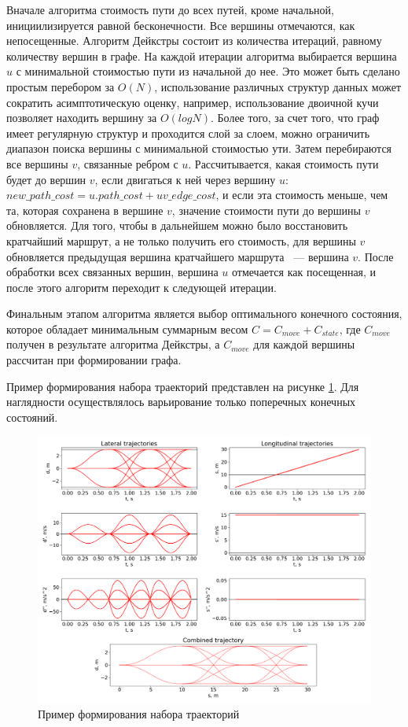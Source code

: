 Вначале алгоритма стоимость пути до всех путей, кроме начальной, инициилизируется равной бесконечности. Все вершины
отмечаются, как непосещенные.
Алгоритм Дейкстры состоит из количества итераций, равному количеству вершин в графе. На каждой итерации алгоритма
выбирается вершина $u$ с минимальной стоимостью пути из начальной до нее. Это может быть сделано
простым перебором за $O(N)$, использование различных структур данных может сократить асимптотическую оценку, например,
использование двоичной кучи позволяет находить вершину за $O(logN)$. Более того, за счет того, что граф
имеет регулярную структур и проходится слой за слоем, можно ограничить диапазон поиска вершины с минимальной стоимостью
ути. Затем перебираются все вершины $v$, связанные ребром с $u$. Рассчитывается, какая стоимость пути будет до вершин $v$,
если двигаться к ней через вершину $u$: $new\_path\_cost = u.path\_cost + uv\_edge\_cost$, и если эта стоимость меньше,
чем та, которая сохранена в вершине $v$, значение стоимости пути до вершины $v$ обновляется. Для того, чтобы в дальнейшем
можно было восстановить кратчайший маршрут, а не только получить его стоимость, для вершины $v$ обновляется предыдущая
вершина кратчайшего маршрута ~--- вершина $v$. После обработки всех связанных вершин, вершина $u$ отмечается как
посещенная, и после этого алгоритм переходит к следующей итерации.

Финальным этапом алгоритма является выбор оптимального конечного состояния, которое обладает минимальным суммарным
весом $C = C_{move} + C_{state}$, где $C_{move}$ получен в результате алгоритма Дейкстры, а $C_{move}$ для каждой
вершины рассчитан при формировании графа.


Пример формирования набора траекторий представлен на рисунке \ref{img:multistep_trajectories}. Для наглядности
осуществлялось варьирование только поперечных конечных состояний.

\begin{figure}[h]
      \centering
      \includegraphics[width=\linewidth]{images/2_project/quintic_2/multistep_trajectories}
      \caption{Пример формирования набора траекторий}
      \label{img:multistep_trajectories}
\end{figure}

